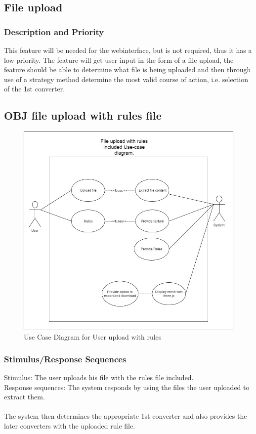\documentclass[english]{article}
\begin{document}
		\subsection{File upload}

			 \subsubsection{Description and Priority}
			 	This feature will be needed for the webinterface, but is not required, thus it has a low priority. The feature will get user input in the form of a file upload, the feature should be able to determine what file is being uploaded and then through use of a strategy method determine the most valid course of action, i.e. selection of the 1st converter.
			 	
			 	\subsection{OBJ file upload with rules file}
			 	\begin{figure}[h]
			 		\includegraphics[width=\textwidth]{Use Cases/rules.jpg}
			 		\caption{Use Case Diagram for User upload with rules }
			 	\end{figure}
			 \subsubsection{Stimulus/Response Sequences}
			 	Stimulus: The user uploads his file with the rules file included.\\
			 	Response sequences: The system responds by using the files the user uploaded to extract them.\\\\
			 	 The system then determines the appropriate 1st converter and also provides the later converters with the uploaded rule file.
			 	 
\end{document}
